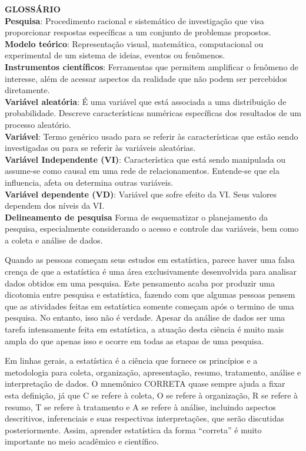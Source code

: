 \documentclass[
]{book}
\begin{document}
\textbf{GLOSSÁRIO}\\
\textbf{Pesquisa}: Procedimento racional e sistemático de investigação que visa proporcionar respostas específicas a um conjunto de problemas propostos.\\
\textbf{Modelo teórico}: Representação visual, matemática, computacional ou experimental de um sistema de ideias, eventos ou fenômenos.\\
\textbf{Instrumentos científicos}: Ferramentas que permitem amplificar o fenômeno de interesse, além de acessar aspectos da realidade que não podem ser percebidos diretamente.\\
\textbf{Variável aleatória}: É uma variável que está associada a uma distribuição de probabilidade. Descreve características numéricas específicas dos resultados de um processo aleatório.\\
\textbf{Variável}: Termo genérico usado para se referir às características que estão sendo investigadas ou para se referir às variáveis aleatórias.\\
\textbf{Variável Independente (VI)}: Característica que está sendo manipulada ou assume-se como causal em uma rede de relacionamentos. Entende-se que ela influencia, afeta ou determina outras variáveis.\\
\textbf{Variável dependente (VD)}: Variável que sofre efeito da VI. Seus valores dependem dos níveis da VI.\\
\textbf{Delineamento de pesquisa} Forma de esquematizar o planejamento da pesquisa, especialmente considerando o acesso e controle das variáveis, bem como a coleta e análise de dados.

Quando as pessoas começam seus estudos em estatística, parece haver uma falsa crença de que a estatística é uma área exclusivamente desenvolvida para analisar dados obtidos em uma pesquisa. Este pensamento acaba por produzir uma dicotomia entre pesquisa e estatística, fazendo com que algumas pessoas pensem que as atividades feitas em estatística somente começam após o termino de uma pesquisa. No entanto, isso não é verdade. Apesar da análise de dados ser uma tarefa intensamente feita em estatística, a atuação desta ciência é muito mais ampla do que apenas isso e ocorre em todas as etapas de uma pesquisa.

Em linhas gerais, a estatística é a ciência que fornece os princípios e a metodologia para coleta, organização, apresentação, resumo, tratamento, análise e interpretação de dados. O mnemônico CORRETA quase sempre ajuda a fixar esta definição, já que C se refere à coleta, O se refere à organização, R se refere à resumo, T se refere à tratamento e A se refere à análise, incluindo aspectos descritivos, inferenciais e suas respectivas interpretações, que serão discutidas posteriormente. Assim, aprender estatística da forma ``correta'' é muito importante no meio acadêmico e científico.
\end{document}
